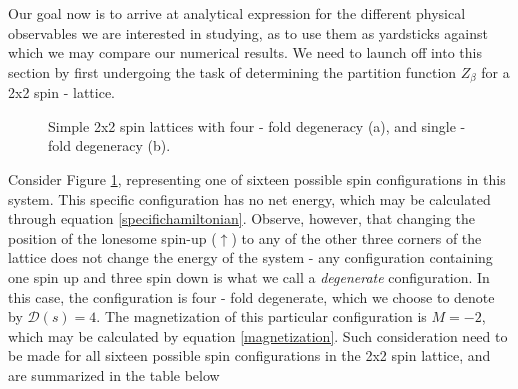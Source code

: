 Our goal now is to arrive at analytical expression for the different physical observables we are interested in studying, as to use them as yardsticks against which we may compare our numerical results. We need to launch off into this section by first undergoing the task of determining the partition function $Z_\beta$ for a 2x2 spin - lattice. 


\begin{figure}[h]
	\centering
	\begin{subfigure}{0.45\linewidth}
	\centering
	\caption{}
	\label{fig:4folddegen2by2lattice}
	\end{subfigure}
    \begin{subfigure}{0.45\linewidth}
    \centering
	\caption{}
	\label{fig:2by2lattice}
    \end{subfigure}
    \caption{Simple 2x2 spin lattices with four - fold degeneracy (a), and single - fold degeneracy (b).}
\end{figure}
Consider Figure \ref{fig:4folddegen2by2lattice}, representing one of sixteen possible spin configurations in this system. This specific configuration has no net energy, which may be calculated through equation \eqref{specifichamiltonian}. Observe, however, that changing the position of the lonesome spin-up ($\uparrow$) to any of the other three corners of the lattice does not change the energy of the system - any configuration containing one spin up and three spin down is what we call a \textit{degenerate} configuration. In this case, the configuration is four - fold degenerate, which we choose to denote by $\mathcal{D}(s) = 4$. The magnetization of this particular configuration is $M = -2$, which may be calculated by equation \eqref{magnetization}. Such consideration need to be made for all sixteen possible spin configurations in the 2x2 spin lattice, and are summarized in the table below
